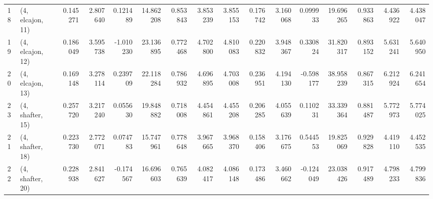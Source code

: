 \begin{tabular}{llrrrrrrrrrrrrrr}
18 &  (4, elcajon, 11) &   0.145271 &  2.807640 &  0.121489 &   14.862208 &  0.853843 &   3.853239 &   3.855153 &  0.176742 &   3.160068 &  0.099933 &   19.696265 &  0.933863 &   4.436922 &   4.438047 \\
19 &  (4, elcajon, 12) &   0.186049 &  3.595738 & -1.010230 &   23.136895 &  0.772468 &   4.702800 &   4.810083 &  0.220832 &   3.948367 &  0.330824 &   31.820317 &  0.893152 &   5.631241 &   5.640950 \\
20 &  (4, elcajon, 13) &   0.169148 &  3.278114 &  0.239709 &   22.118284 &  0.786932 &   4.696895 &   4.703008 &  0.236951 &   4.194130 & -0.598177 &   38.958239 &  0.867315 &   6.212924 &   6.241654 \\
23 &  (4, shafter, 15) &   0.257720 &  3.217240 &  0.055630 &   19.848882 &  0.718008 &   4.454861 &   4.455208 &  0.206285 &   4.055639 &  0.110231 &   33.339364 &  0.881487 &   5.772973 &   5.774025 \\
21 &  (4, shafter, 18) &   0.223730 &  2.772071 &  0.074783 &   15.747961 &  0.778648 &   3.967665 &   3.968370 &  0.158406 &   3.176675 &  0.544553 &   19.825069 &  0.929828 &   4.419110 &   4.452535 \\
22 &  (4, shafter, 20) &   0.228938 &  2.841627 & -0.174567 &   16.696603 &  0.765639 &   4.082417 &   4.086148 &  0.173486 &   3.460662 & -0.124049 &   23.038426 &  0.917489 &   4.798233 &   4.799836 \\
\bottomrule
\end{tabular}
